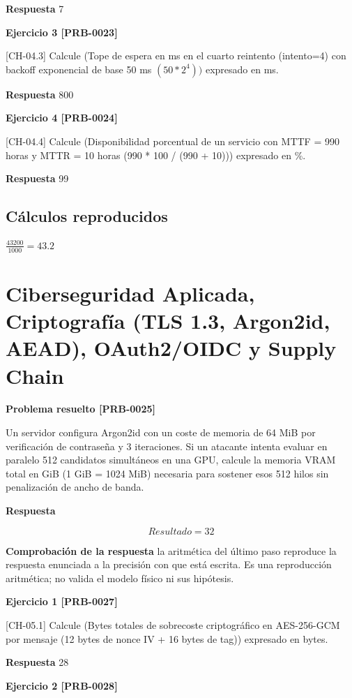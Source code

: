 \documentclass{book}
\begin{document}
\noindent\textbf{Respuesta} 7

\noindent\textbf{Ejercicio 3 [PRB-0023]}

[CH-04.3] Calcule (Tope de espera en ms en el cuarto reintento (intento=4) con backoff exponencial de base 50 ms \((50 * 2^4))\) expresado en ms.

\noindent\textbf{Respuesta} 800

\noindent\textbf{Ejercicio 4 [PRB-0024]}

[CH-04.4] Calcule (Disponibilidad porcentual de un servicio con MTTF = 990 horas y MTTR = 10 horas (990 * 100 / (990 + 10))) expresado en \%.

\noindent\textbf{Respuesta} 99

\subsection*{Cálculos reproducidos}

\(\frac{43200}{1000} = 43.2\)

\section{Ciberseguridad Aplicada, Criptografía (TLS 1.3, Argon2id, AEAD), OAuth2/OIDC y Supply Chain}

\noindent\textbf{Problema resuelto [PRB-0025]}

Un servidor configura Argon2id con un coste de memoria de 64 MiB por verificación de contraseña y 3 iteraciones. Si un atacante intenta evaluar en paralelo 512 candidatos simultáneos en una GPU, calcule la memoria VRAM total en GiB (1 GiB = 1024 MiB) necesaria para sostener esos 512 hilos sin penalización de ancho de banda.

\noindent\textbf{Respuesta}

\[
Resultado = 32
\]

\noindent\textbf{Comprobación de la respuesta} la aritmética del último paso reproduce la respuesta enunciada a la precisión con que está escrita. Es una reproducción aritmética; no valida el modelo físico ni sus hipótesis.

\noindent\textbf{Ejercicio 1 [PRB-0027]}

[CH-05.1] Calcule (Bytes totales de sobrecoste criptográfico en AES-256-GCM por mensaje (12 bytes de nonce IV + 16 bytes de tag)) expresado en bytes.

\noindent\textbf{Respuesta} 28

\noindent\textbf{Ejercicio 2 [PRB-0028]}
\end{document}
